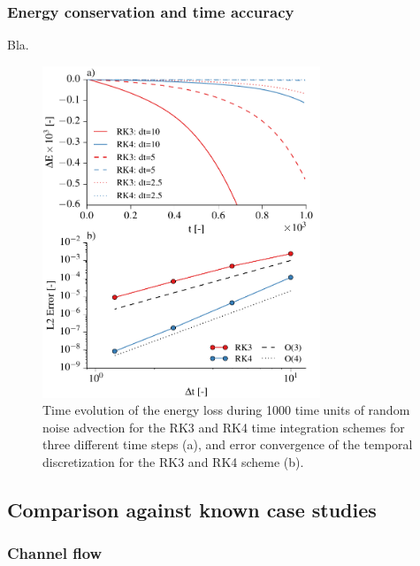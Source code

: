 \documentclass[gmd]{copernicus}
\begin{document}
\subsubsection{Energy conservation and time accuracy}\label{sec:validationtime}
Bla.
\begin{figure}[t]
\vspace*{2mm}
\begin{center}
\includegraphics[width=8.3cm]{figs/timeconvergence.pdf}
\end{center}
\caption{Time evolution of the energy loss during 1000 time units of random noise advection for the RK3 and RK4 time integration schemes for three different time steps (a), and error convergence of the temporal discretization for the RK3 and RK4 scheme (b).}
\end{figure}

\subsection{Comparison against known case studies}
\subsubsection{Channel flow}
\end{document}
